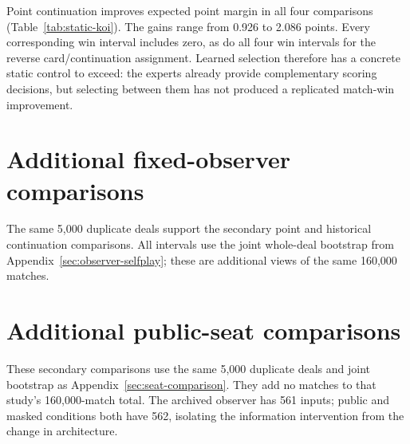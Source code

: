 \documentclass[11pt]{article}
\begin{document}
Point continuation improves expected point margin in all four comparisons
(Table~\ref{tab:static-koi}). The gains range from 0.926 to 2.086 points.
Every corresponding win interval includes zero, as do all four win intervals
for the reverse card/continuation assignment. Learned selection therefore has
a concrete static control to exceed: the experts already provide complementary
scoring decisions, but selecting between them has not produced a replicated
match-win improvement.


\section{Additional fixed-observer comparisons}
\label{app:observer-controls}
The same 5,000 duplicate deals support the secondary point and historical
continuation comparisons. All intervals use the joint whole-deal bootstrap
from Appendix~\ref{sec:observer-selfplay}; these are additional views of the same
160,000 matches.

\begin{table}[ht]
\centering\small

\caption{Fixed-observer self-play: paired changes in final point margin and
95\% intervals. Positive values favor the observer condition.}
\label{tab:observer-selfplay-points}
\end{table}

\begin{table}[ht]
\centering\small

\caption{Historical ordinary self-play controls on the observer-study deals:
paired win-score changes in percentage points, with 95\% intervals. Their
training work is reused rather than added to the new continuation budget.}
\label{tab:observer-selfplay-historical}
\end{table}

\section{Additional public-seat comparisons}
\label{app:seat-controls}
These secondary comparisons use the same 5,000 duplicate deals and joint
bootstrap as Appendix~\ref{sec:seat-comparison}. They add no matches to that
study's 160,000-match total. The archived observer has 561 inputs; public and
masked conditions both have 562, isolating the information intervention from
the change in architecture.

\begin{table}[ht]
\centering\small

\caption{Public-seat comparison: paired changes in final point margin,
with 95\% intervals.}
\label{tab:seat-points}
\end{table}
\end{document}
